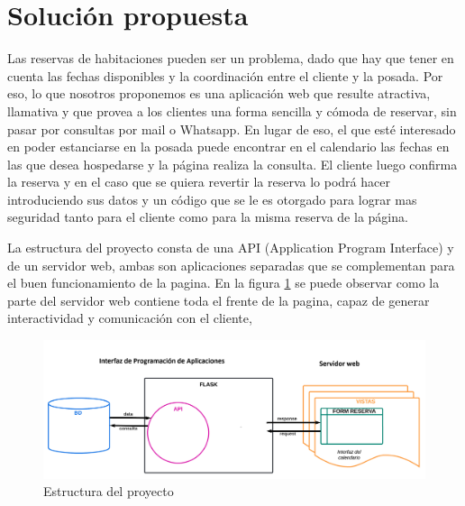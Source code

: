 \section{Solución propuesta}

Las reservas de habitaciones pueden ser un problema, dado que hay que tener en cuenta las fechas disponibles y la coordinación entre el cliente y la posada. Por eso, lo que nosotros proponemos es una aplicación web que resulte atractiva, llamativa y que provea a los clientes una forma sencilla y cómoda de reservar, sin pasar por consultas por mail o Whatsapp. En lugar de eso, el que esté interesado en poder estanciarse en la posada puede encontrar en el calendario las fechas en las que desea hospedarse y la página realiza la consulta. El cliente luego confirma la reserva y en el caso que se quiera revertir la reserva lo podrá hacer introduciendo sus datos y un código que se le es otorgado para lograr mas seguridad tanto para el cliente como para la misma reserva de la página.

La estructura del proyecto consta de una API (Application Program Interface) y de un servidor web, ambas son aplicaciones separadas que se complementan para el buen funcionamiento de la pagina. En la figura \ref{fig:Est} se puede observar como la parte del servidor web contiene toda el frente de la pagina, capaz de generar interactividad y comunicación con el cliente, 



\begin{figure}
    \centering
    \includegraphics[width=1\linewidth]{images/Estructura_de_pagina.png}
    \caption{Estructura del proyecto}
    \label{fig:Est}
\end{figure}